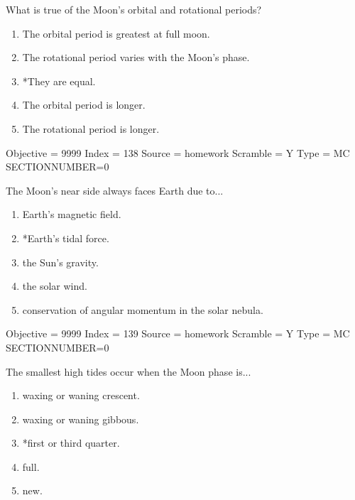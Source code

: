\documentclass[11pt]{article}
\begin{document}
\begin{enumerate}
\begin{minipage}{\textwidth}
\begin{minipage}{\textwidth}
\item What is true of the Moon's orbital and rotational periods?
\begin{enumerate} 
\setlength{\itemsep}{1pt} 
\setlength{\parskip}{0pt} 
\setlength{\parsep}{0pt}
\setlength{\multicolsep}{1pt} 
\item The orbital period is greatest at full moon.
\item The rotational period varies with the Moon's phase.
\item *They are equal.
\item The orbital period is longer.
\item The rotational period is longer.
\end{enumerate} 
Objective = 9999
Index = 138
Source = homework
Scramble = Y
Type = MC
SECTIONNUMBER=0
\end{minipage}
\end{minipage}
\vskip 0.20in

\begin{minipage}{\textwidth}
\begin{minipage}{\textwidth}
\item The Moon's near side always faces Earth due to...
\begin{enumerate} 
\setlength{\itemsep}{1pt} 
\setlength{\parskip}{0pt} 
\setlength{\parsep}{0pt}
\setlength{\multicolsep}{1pt} 
\item Earth's magnetic field.
\item *Earth's tidal force.
\item the Sun's gravity.
\item the solar wind.
\item conservation of angular momentum in the solar nebula.
\end{enumerate} 
Objective = 9999
Index = 139
Source = homework
Scramble = Y
Type = MC
SECTIONNUMBER=0
\end{minipage}
\end{minipage}
\vskip 0.20in

\begin{minipage}{\textwidth}
\begin{minipage}{\textwidth}
\item The smallest high tides occur when the Moon phase is...
\begin{multicols}{2}
\begin{enumerate} 
\setlength{\itemsep}{1pt} 
\setlength{\parskip}{0pt} 
\setlength{\parsep}{0pt}
\setlength{\multicolsep}{1pt} 
\item waxing or waning crescent.
\item waxing or waning gibbous.
\item *first or third quarter.
\item full.
\item new.
\end{enumerate} 
\vfill 
\end{multicols}


\end{minipage}
\end{minipage}
\end{enumerate}
\end{document}
